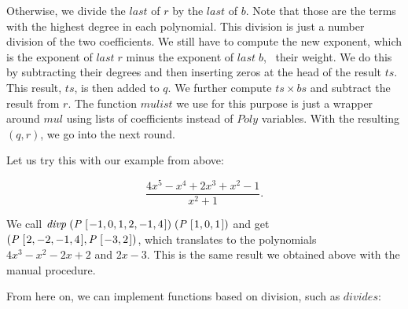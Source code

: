 \documentclass[tikz]{scrreprt}
\newcommand{\Conid}[1]{\mathit{#1}}
\newcommand{\Varid}[1]{\mathit{#1}}
\begin{document}
Otherwise, we divide the \ensuremath{\Varid{last}} of $r$ by the \ensuremath{\Varid{last}} of $b$.
Note that those are the terms with the highest degree
in each polynomial.
This division is just a number division of the two
coefficients. We still have to compute the new exponent,
which is the exponent of \ensuremath{\Varid{last}\;\Varid{r}} minus the exponent of 
\ensuremath{\Varid{last}\;\Varid{b}}, \ie\ their weight. We do this by subtracting
their degrees and then inserting zeros 
at the head of the result \ensuremath{\Varid{ts}}.
This result, \ensuremath{\Varid{ts}}, is then added to $q$.
We further compute $ts \times bs$ and subtract
the result from $r$. The function \ensuremath{\Varid{mulist}} we use for this purpose
is just a wrapper around \ensuremath{\Varid{mul}} using
lists of coefficients instead of \ensuremath{\Conid{Poly}} variables.
With the resulting $(q,r)$, we go into the next round.

Let us try this with our example from above: 

\[
\frac{4x^5 - x^4 + 2x^3 + x^2 - 1}{x^2 + 1}.
\]

We call \ensuremath{\Varid{divp}\;(\Conid{P}\;[\mskip1.5mu \mathbin{-}\mathrm{1},\mathrm{0},\mathrm{1},\mathrm{2},\mathbin{-}\mathrm{1},\mathrm{4}\mskip1.5mu])\;(\Conid{P}\;[\mskip1.5mu \mathrm{1},\mathrm{0},\mathrm{1}\mskip1.5mu])} and get
\ensuremath{(\Conid{P}\;[\mskip1.5mu \mathrm{2},\mathbin{-}\mathrm{2},\mathbin{-}\mathrm{1},\mathrm{4}\mskip1.5mu],\Conid{P}\;[\mskip1.5mu \mathbin{-}\mathrm{3},\mathrm{2}\mskip1.5mu])}, which translates to the polynomials
$4x^3-x^2-2x+2$ and $2x - 3$. 
This is the same result we obtained above 
with the manual procedure.

From here on, we can implement functions based on division,
such as \ensuremath{\Varid{divides}}:
\end{document}
